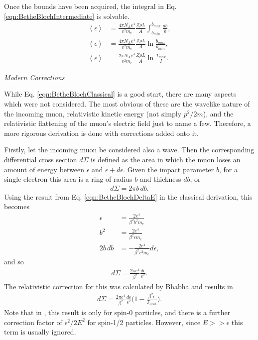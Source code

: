 Once the bounds have been acquired, the integral in Eq. \eqref{eqn:BetheBlochIntermediate} is solvable.
\begin{align}
\left<\epsilon\right> &= \frac{4\pi N_A e^4}{v^2 m_e} \frac{Z\rho L}{A}\int_{b_{min}} ^{b_{max}} \frac{db}{b},\nonumber\\
\left<\epsilon\right> &= \frac{4\pi N_A e^4}{v^2 m_e} \frac{Z\rho L}{A} \ln{\frac{b_{max}}{b_{min}}},\nonumber\\
\left<\epsilon\right> &= \frac{2\pi N_A e^4}{v^2 m_e} \frac{Z\rho L}{A} \ln{\frac{T_{max}}{I}} \label{eqn:BetheBlochClassical}.
\end{align}

\noindent \textit{\large{Modern Corrections}}

\iffalse
While Eq. \eqref{eqn:BetheBlochClassical} is a good start, there are many aspects which were not considered. The most obvious of these are the wavelike nature of the incoming muon, relativistic kinetic energy (not simply $p^2/2m$), and the relativistic flattening of the muon's electric field just to name a few. Therefore, a more rigorous derivation is done with corrections added onto it.

Firstly, let the incoming muon be considered also a wave. Then the corresponding differential cross section $d\Sigma$ is defined as the area in which the muon loses an amount of energy between $\epsilon$ and $\epsilon+d\epsilon$. Given the impact parameter $b$, for a single electron this area is a ring of radius $b$ and thickness $db$, or \cite{bichsel1968,bichsel1988}
\begin{align*}
d\Sigma=2\pi b \, db.
\end{align*}
Using the result from Eq. \eqref{eqn:BetheBlochDeltaE} in the classical derivation, this becomes
\begin{align*}
\epsilon &= \frac{2e^4}{\beta^2 b^2 m_e}\\
b^2 &= \frac{2e^4}{\beta^2 \epsilon m_e}\\
2b \, db &= -\frac{2e^4}{\beta^2 \epsilon^2 m_e}d\epsilon,
\end{align*}
and so
\begin{align*}
d\Sigma=\frac{2\pi e^4}{\beta^2} \frac{d\epsilon}{\epsilon ^2}.
\end{align*}
The relativistic correction for this was calculated by Bhabha \cite{uehling,bhabha} and results in
\begin{align*}
d\Sigma=\frac{2\pi e^4}{\beta^2} \frac{d\epsilon}{\epsilon ^2}\Big(1-\frac{\beta^2 \epsilon}{T_{max}}\Big).
\end{align*}
Note that in \cite{uehling}, this result is only for spin-0 particles, and there is a further correction factor of $\epsilon ^2 / 2E^2$ for spin-1/2 particles. However, since $E>>\epsilon$ this term is usually ignored.

